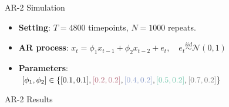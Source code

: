 \documentclass[12pt]{beamer}
\begin{document}
\begin{frame}{AR-2 Simulation}
\footnotesize
\begin{itemize}
    \item \textbf{Setting}: $T = 4800$ timepoints, $N = 1000$ repeats.
    \item \textbf{AR process}: $x_t = \phi_1 x_{t-1} + \phi_2 x_{t-2} + e_t, \quad e_t \overset{iid}{\sim} \mathcal{N}(0, 1)$
    \item \textbf{Parameters}:\\
    $[\phi_1, \phi_2] \in \{\textcolor[HTML]{000000}{[0.1,0.1]}, \textcolor[HTML]{B66B7C}{[0.2,0.2]}, \textcolor[HTML]{8D9FCB}{[0.4,0.2]}, \textcolor[HTML]{66C2A6}{[0.5,0.2]}, \textcolor[HTML]{7D7D7D}{[0.7,0.2]}\}$\\
\end{itemize}
\vspace{0.25cm}
\centering
{}
\end{frame}

\begin{frame}{AR-2 Results}
\end{frame}

\end{document}
